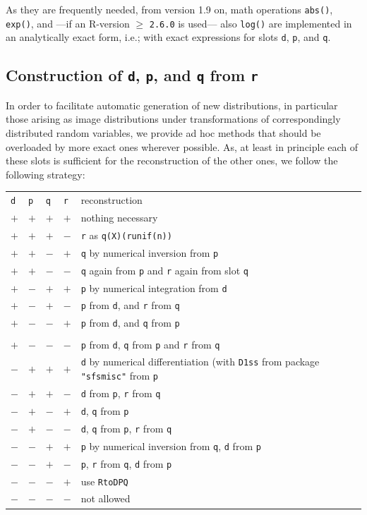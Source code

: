 \documentclass[11pt]{article}
\newcommand{\code}[1]{{\tt #1}}
\newcommand{\pkg}[1]{{\tt "#1"}}
\begin{document}
As they are frequently needed, from version 1.9 on, math operations
\code{abs()}, \code{exp()}, and ---if an {\sf R}-version $\ge$ {\tt 2.6.0} is
used--- also \code{log()} are implemented in an analytically exact form,
i.e.; with exact expressions for slots \code{d}, \code{p}, and \code{q}.

%
\subsection{Construction of \code{d}, \code{p}, and \code{q} from \code{r}}
%
In order to facilitate automatic generation of new distributions, in particular
those arising as image distributions under transformations of correspondingly
distributed random variables, we provide ad hoc methods that should be
overloaded by more exact ones wherever possible. As, at least in principle
each of these slots is sufficient for the reconstruction of the other ones,
we follow the following strategy:
\\
\begin{tabular}{llll|p{8cm}}
\code{d} & \code{p} &  \code{q} & \code{r} & reconstruction\\
$+$&$+$&$+$&$+$&nothing necessary\\
$+$&$+$&$+$&$-$&\code{r} as \code{q(X)(runif(n))}\\
$+$&$+$&$-$&$+$&\code{q} by numerical inversion from \code{p}\\
$+$&$+$&$-$&$-$&\code{q} again from \code{p} and
                         \code{r} again from slot \code{q}\\
$+$&$-$&$+$&$+$&\code{p} by numerical integration from \code{d}\\
$+$&$-$&$+$&$-$&\code{p} from \code{d}, and \code{r} from  \code{q}\\
$+$&$-$&$-$&$+$&\code{p} from \code{d}, and \code{q} from  \code{p}\\
\\
$+$&$-$&$-$&$-$&\code{p} from \code{d},
\code{q} from \code{p} and \code{r} from  \code{q}\\
$-$&$+$&$+$&$+$&\code{d} by numerical differentiation (with \code{D1ss}
from package \pkg{sfsmisc} from \code{p}\\
$-$&$+$&$+$&$-$&\code{d} from \code{p}, \code{r} from \code{q}\\
$-$&$+$&$-$&$+$&\code{d}, \code{q}  from \code{p}\\
$-$&$+$&$-$&$-$&\code{d}, \code{q}  from \code{p}, \code{r} from \code{q}\\
$-$&$-$&$+$&$+$&\code{p} by numerical inversion from \code{q},
                \code{d} from \code{p}\\
$-$&$-$&$+$&$-$&\code{p}, \code{r} from \code{q}, \code{d} from \code{p}\\
$-$&$-$&$-$&$+$& use \code{RtoDPQ}\\
$-$&$-$&$-$&$-$&not allowed\\
\end{tabular}
\end{document}
